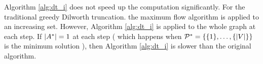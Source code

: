 \documentclass{article}
\begin{document}
Algorithm \ref{alg:dt_i} does not speed up the computation significantly. For the traditional greedy Dilworth truncation. the maximum flow algorithm is applied to an increasing set. However, Algorithm \ref{alg:dt_i} is applied to the whole graph at each step. If $\lvert A^*\rvert = 1$ at each step ( which happens when $\mathcal{P}^* = \{\{1\},\dots, \{\lvert V\rvert\}\}$ is the minimum solution ), then Algorithm \ref{alg:dt_i} is slower than the original algorithm.
\end{document}
